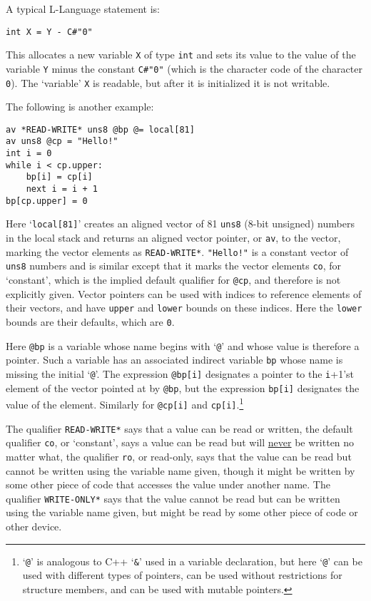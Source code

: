 \documentclass[12pt]{article}
\newenvironment{indpar}[1][0.3in]%
	{\begin{list}{}%
		     {\setlength{\itemsep}{0in}%
		      \setlength{\topsep}{0in}%
		      \setlength{\parsep}{1ex}%
		      \setlength{\labelwidth}{#1}%
		      \setlength{\leftmargin}{#1}%
		      \addtolength{\leftmargin}{\labelsep}}%
	 \item}%
	{\end{list}}
\begin{document}
A typical L-Language statement is:
\begin{indpar}\begin{verbatim}
int X = Y - C#"0"
\end{verbatim}\end{indpar}
This allocates a new variable {\tt X} of type {\tt int}
and sets its value to the value of the
variable {\tt Y} minus the constant {\tt C\#"0"} (which is
the character code of the character {\tt 0}).
The `variable' {\tt X} is readable, but after it is
initialized it is not writable.

The following is another example:
\begin{indpar}\begin{verbatim}
av *READ-WRITE* uns8 @bp @= local[81]
av uns8 @cp = "Hello!"
int i = 0
while i < cp.upper:
    bp[i] = cp[i]
    next i = i + 1
bp[cp.upper] = 0
\end{verbatim}\end{indpar}

Here `{\tt local[81]}' creates an aligned vector of
81 {\tt uns8} (8-bit unsigned) numbers in the local stack
and returns an aligned vector pointer, or {\tt av}, to
the vector, marking the vector elements as {\tt *READ-WRITE*}.
{\tt "Hello!"} is a constant vector of {\tt uns8} numbers
and is similar except that it marks the vector elements
{\tt co}, for `constant', which is the implied default qualifier
for {\tt @cp}, and therefore
is not explicitly given.
Vector pointers can be used with indices
to reference elements of their vectors, and have {\tt upper} and
{\tt lower} bounds on these indices.  Here the {\tt lower} bounds
are their defaults, which are {\tt 0}.

Here {\tt @bp} is a variable whose name begins with `{\tt @}' and
whose value is therefore a pointer.  Such a variable has an associated
indirect variable {\tt bp} whose name is missing the initial `{\tt @}'.
The expression {\tt @bp[i]} designates a pointer to the {\tt i}+1'st
element of the vector pointed at by {\tt @bp}, but the expression
{\tt bp[i]} designates the value of the element.  Similarly for
{\tt @cp[i]} and {\tt cp[i]}.\footnote{`{\tt @}' is analogous to
C++ `{\tt \&}' used in a variable declaration, but here `{\tt @}'
can be used with different types of pointers, can be used
without restrictions for structure members, and can be used
with mutable pointers.}

The qualifier {\tt *READ-WRITE*} says that a value can be read or written,
the default qualifier {\tt co}, or `constant',
says a value can be read but will \underline{never} be written no matter what,
the qualifier {\tt ro}, or read-only, says that
the value can be read but
cannot be written using the variable name given, though it might be
written by some other piece of code that accesses the value under another
name.  The qualifier {\tt *WRITE-ONLY*} says that the value cannot be
read but can be written using the variable name given,
but might be read by some other piece of code or other device.
\end{document}
